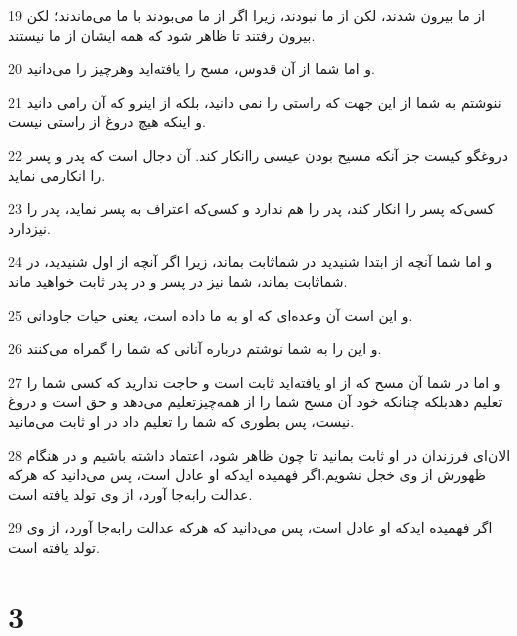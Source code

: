 \par 19 از ما بیرون شدند، لکن از ما نبودند، زیرا اگر از ما می‌بودند با ما می‌ماندند؛ لکن بیرون رفتند تا ظاهر شود که همه ایشان از ما نیستند.
\par 20 و اما شما از آن قدوس، مسح را یافته‌اید وهرچیز را می‌دانید.
\par 21 ننوشتم به شما از این جهت که راستی را نمی دانید، بلکه از اینرو که آن رامی دانید و اینکه هیچ دروغ از راستی نیست.
\par 22 دروغگو کیست جز آنکه مسیح بودن عیسی راانکار کند. آن دجال است که پدر و پسر را انکارمی نماید.
\par 23 کسی‌که پسر را انکار کند، پدر را هم ندارد و کسی‌که اعتراف به پسر نماید، پدر را نیزدارد.
\par 24 و اما شما آنچه از ابتدا شنیدید در شماثابت بماند، زیرا اگر آنچه از اول شنیدید، در شماثابت بماند، شما نیز در پسر و در پدر ثابت خواهید ماند.
\par 25 و این است آن وعده‌ای که او به ما داده است، یعنی حیات جاودانی.
\par 26 و این را به شما نوشتم درباره آنانی که شما را گمراه می‌کنند.
\par 27 و اما در شما آن مسح که از او یافته‌اید ثابت است و حاجت ندارید که کسی شما را تعلیم دهدبلکه چنانکه خود آن مسح شما را از همه‌چیزتعلیم می‌دهد و حق است و دروغ نیست، پس بطوری که شما را تعلیم داد در او ثابت می‌مانید.
\par 28 الان‌ای فرزندان در او ثابت بمانید تا چون ظاهر شود، اعتماد داشته باشیم و در هنگام ظهورش از وی خجل نشویم.اگر فهمیده ایدکه او عادل است، پس می‌دانید که هر‌که عدالت رابه‌جا آورد، از وی تولد یافته است.
\par 29 اگر فهمیده ایدکه او عادل است، پس می‌دانید که هر‌که عدالت رابه‌جا آورد، از وی تولد یافته است.

\chapter{3}


